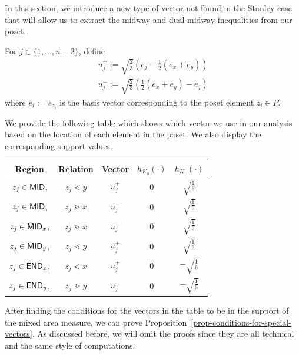 \documentclass{puthesis-UG}
\begin{document}
In this section, we introduce a new type of vector not found in the Stanley case that will allow us to extract the midway and dual-midway inequalities from our poset.

\begin{defn} \label{special-vectors}
    For $j \in \{1, \ldots, n-2\}$, define 
    \begin{align*}
        u_j^+ := \sqrt{\frac{2}{3}} \left ( e_j - \frac{1}{2}(e_x + e_y) \right ) \\
        u_j^- := \sqrt{\frac{2}{3}} \left ( \frac{1}{2} (e_x + e_y) - e_j \right )
    \end{align*}
    where $e_i := e_{z_i}$ is the basis vector corresponding to the poset element $z_i \in P$.
\end{defn}

We provide the following table which shows which vector we use in our analysis based on the location of each element in the poset. We also display the corresponding support values. 

\begin{center}
    \begin{tabular}{||c c c c c||} 
         \hline
         Region & Relation & Vector & $h_{K_0}(\cdot)$ & $h_{K_1}(\cdot)$ \\ [0.5ex] 
         \hline\hline
         $z_j \in \mathsf{MID}$, & $z_j \lessdot y$ & $u_j^+$ & $0$ & $\sqrt{\frac{1}{6}}$ \\
         \hline
         $z_j \in \mathsf{MID}$, & $z_j \gtrdot x$ & $u_j^-$ & $0$ & $\sqrt{\frac{1}{6}}$ \\
         \hline
         $z_j \in \mathsf{MID}_x$, & $z_j \gtrdot x$ & $u_j^-$ & $0$ & $\sqrt{\frac{1}{6}}$\\
         \hline 
         $z_j \in \mathsf{MID}_y$, & $z_j \lessdot y$ & $u_j^+$ & $0$ & $\sqrt{\frac{1}{6}}$ \\
         \hline
         $z_j \in \mathsf{END}_x$, & $z_j \lessdot x$ & $u_j^+$ & $0$ & $-\sqrt{\frac{1}{6}}$ \\
         \hline 
         $z_j \in \mathsf{END}_y$, & $z_j \gtrdot y$ & $u_j^-$ & $0$ & $-\sqrt{\frac{1}{6}}$ \\
         \hline 
    \end{tabular}
\end{center}

After finding the conditions for the vectors in the table to be in the support of the mixed area measure, we can prove Proposition~\ref{prop-conditions-for-special-vectors}. As discussed before, we will omit the proofs since they are all technical and the same style of computations. 
\end{document}
